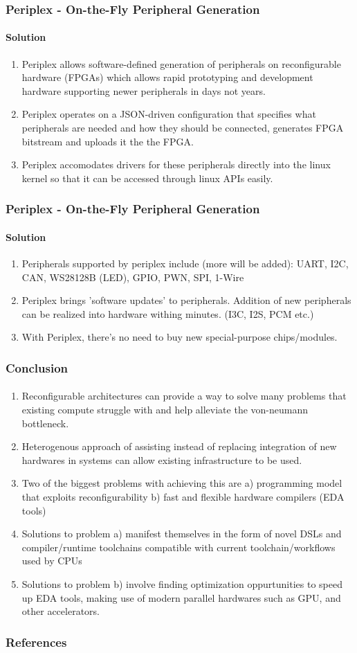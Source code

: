 \documentclass{beamer}
\begin{document}
\begin{frame}[fragile]
  \frametitle{Periplex - On-the-Fly Peripheral Generation}
  \framesubtitle{Solution}
  \begin{enumerate}
    \item Periplex allows software-defined generation of peripherals on
      reconfigurable hardware (FPGAs) which allows rapid prototyping
      and development hardware supporting newer peripherals in days not years.
    \item Periplex operates on a JSON-driven configuration that specifies 
      what peripherals are needed and how they should be connected, 
      generates FPGA bitstream and uploads it the the FPGA.
    \item Periplex accomodates drivers for these peripherals directly into
      the linux kernel so that it can be accessed through linux APIs easily.
  \end{enumerate}
\end{frame}

\begin{frame}[fragile]
  \frametitle{Periplex - On-the-Fly Peripheral Generation}
  \framesubtitle{Solution}
  \begin{enumerate}
     \item Peripherals supported by periplex include (more will be added):
       UART, I2C, CAN, WS28128B (LED), GPIO, PWN, SPI, 1-Wire
     \item Periplex brings 'software updates' to peripherals. Addition of new
       peripherals can be realized into hardware withing minutes. (I3C, I2S,
       PCM etc.)
     \item With Periplex, there's no need to buy new special-purpose
       chips/modules.
  \end{enumerate}
\end{frame}

\begin{frame}[fragile]
  \frametitle{Conclusion}
  \framesubtitle{}

  \begin{enumerate}
    \item Reconfigurable architectures can provide a way to solve many problems
      that existing compute struggle with and help alleviate the von-neumann
      bottleneck.
    \item Heterogenous approach of assisting instead of replacing integration of
      new hardwares in systems can allow existing infrastructure to be used.
    \item Two of the biggest problems with achieving this are a) programming
      model that exploits reconfigurability b) fast and flexible hardware
      compilers (EDA tools)
    \item Solutions to problem a) manifest themselves in the form of novel DSLs
      and compiler/runtime toolchains compatible with current
      toolchain/workflows used by CPUs
    \item Solutions to problem b) involve finding optimization oppurtunities
      to speed up EDA tools, making use of modern parallel hardwares such as
      GPU, and other accelerators.
  \end{enumerate}
\end{frame}

\begin{frame}[allowframebreaks]
\frametitle{References}
\printbibliography
\end{frame}
\end{document}
